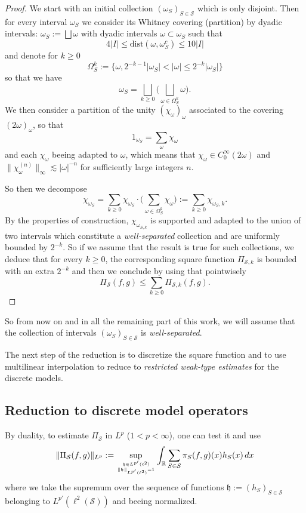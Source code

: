 \documentclass[a4paper,11pt,oneside]{amsart}
\newcommand{\hh}{\mathfrak{h}}
\theoremstyle{plain}
\theoremstyle{definition}
\begin{document}
\begin{proof} We start with an initial collection $(\omega_S)_{S\in{\mathcal S}}$ which is only disjoint. Then for every interval $\omega_S$ we consider its Whitney covering (partition) by dyadic intervals: $\omega_S:= \bigsqcup \omega$ with dyadic intervals $\omega \subset \omega_S$ such that
$$ 4 |I| \leq \textrm{dist}(\omega, \omega_S^c) \leq 10 |I|$$
and denote for $k\geq 0$
$$ \Omega_S^k:=\{\omega, 2^{-k-1} |\omega_S| < |\omega| \leq 2^{-k} |\omega_S|\}$$ so that we have 
$$ \omega_S = \bigsqcup_{k\geq 0} \big( \bigsqcup_{\omega\in\Omega_S^k} \omega\big).$$
We then consider a partition of the unity $(\chi_{\omega})_{\omega}$ associated to the covering $(2\omega)_{\omega}$, so that
$$ 1_{\omega_S} = \sum_{\omega} \chi_{\omega}$$
and each $\chi_{\omega}$ beeing adapted to $\omega$, which means that $\chi_{\omega}\in C^\infty_0(2\omega)$ and $\|\chi_{\omega}^{(n)}\|_\infty \lesssim |\omega|^{-n}$ for sufficiently large integers $n$.

So then we decompose
$$ \chi_{\omega_S} = \sum_{k\geq 0} \chi_{\omega_S} \cdot \big(\sum_{\omega \in \Omega_S^k} \chi_{\omega}\big) := \sum_{k\geq 0} \chi_{\omega_S,k}.$$ 
By the properties of construction, $\chi_{\omega_{S,k}}$ is supported and adapted to the union of two intervals which constitute a {\it well-separated} collection and are uniformly bounded by $2^{-k}$. So if we assume that the result is true for such collections, we deduce that for every $k\geq 0$, the corresponding square function $\Pi_{{\mathcal S},k}$ is bounded with an extra $2^{-k}$ and then we conclude by using that pointwisely
$$ \Pi_{\mathcal S}(f,g) \leq \sum_{k\geq 0} \Pi_{{\mathcal S},k}(f,g).$$ 
\end{proof}

So from now on and in all the remaining part of this work, we will assume that the collection of intervals $(\omega_S)_{S\in{\mathcal S}}$ is {\it well-separated}.

The next step of the reduction is to discretize the square function and to use multilinear interpolation to reduce to {\it restricted weak-type estimates} for the discrete models.

\subsection{Reduction to discrete model operators}

By duality, to estimate $\Pi_{\mathcal S}$ in $L^p$ ($1<p<\infty$), one can test it and use
$$ \|\Pi_{\mathcal S}(f,g)\|_{L^p} := \sup_{\hh\in L^{p'}(\ell^2)  \atop \|\hh\|_{L^{p'}(\ell^2)}=1} \int_{\mathbb R} \sum_{S\in{\mathcal S}} \pi_{S}(f,g)(x) h_{S}(x)\, dx$$
where we take the supremum over the sequence of functions $\hh:=(h_S)_{S\in {\mathcal S}}$ belonging to $L^{p'}(\ell^2({\mathcal S}))$ and beeing normalized.
\end{document}

